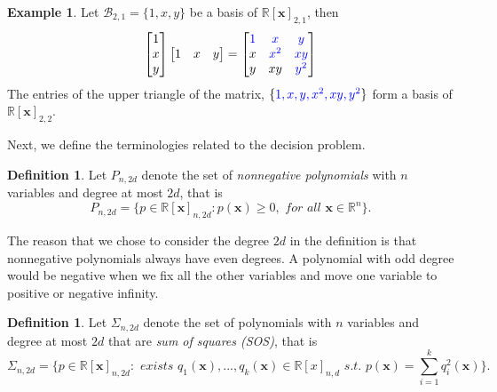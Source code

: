 \documentclass[12pt]{amsart}
\numberwithin{equation}{section}
\theoremstyle{definition}
\newtheorem{definition}[thm]{Definition}
\newtheorem{example}[thm]{Example}
\numberwithin{thm}{section}
\begin{document}
\begin{example}
     Let $\mathcal{B}_{2, 1} = \{1, x, y\}$ be a basis of $\mathbb{R}[\mathbf{x}]_{2, 1}$, then 
     \begin{equation*}
          \begin{bmatrix}
               1 \\
               x \\
               y
          \end{bmatrix}
          \begin{bmatrix}
               1 & x & y
          \end{bmatrix}
          = \begin{bmatrix}
               \color{blue} 1 & \color{blue}x & \color{blue}y \\
               x & \color{blue}x^2 & \color{blue}xy \\
               y & xy & \color{blue}y^2 \\
          \end{bmatrix}
     \end{equation*}
     The entries of the upper triangle of the matrix, $\{\color{blue}1, x, y, x^2, xy, y^2\color{black}\}$ form a basis of $\mathbb{R}[\mathbf{x}]_{2, 2}$.
\end{example}

\smallskip

Next, we define the terminologies related to the decision problem.

\begin{definition}
     \label{def:NGP}
     Let $P_{n, 2d}$ denote the set of \emph{nonnegative polynomials} with 
     $n$ variables and degree at most $2d$, that is 
     \begin{equation*}
          P_{n, 2d} = \{ p \in \mathbb{R}[\mathbf{x}]_{n, 2d}: p(\mathbf{x}) \geq 0, \textit{ for all } \mathbf{x} \in \mathbb{R}^n \}.
     \end{equation*}
\end{definition}


The reason that we chose to consider the degree $2d$ in the definition is that {nonnegative polynomials} always have even degrees.
A polynomial with odd degree would be negative when we fix all the other variables and move one variable to positive or negative infinity. 

\begin{definition}
     \label{def:SOS}
          Let $\Sigma_{n,2d}$ denote the set of polynomials with $n$ variables and degree at most
          $2d$ that are \emph{sum of squares (SOS)}, that is
          \begin{equation*}
               \Sigma_{n, 2d} = \{ p \in \mathbb{R}[\mathbf{x}]_{n, 2d}: \textit{ exists } q_1(\mathbf{x}), ..., q_k(\mathbf{x}) \in \mathbb{R}[x]_{n,d} \textit{ s.t. }  p(\mathbf{x}) = \sum_{i=1}^k q_i^2(\mathbf{x})\}.
          \end{equation*}     
\end{definition}
\end{document}
